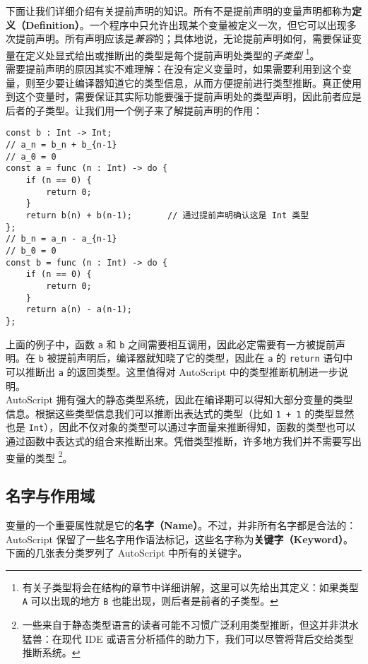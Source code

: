下面让我们详细介绍有关提前声明的知识。所有不是提前声明的变量声明都称为\textbf{定义（Definition）}。一个程序中只允许出现某个变量被定义一次，但它可以出现多次提前声明。所有声明应该是\emph{兼容}的；具体地说，无论提前声明如何，需要保证变量在定义处显式给出或推断出的类型是每个提前声明处类型的\emph{子类型} \footnote{有关子类型将会在结构的章节中详细讲解，这里可以先给出其定义：如果类型 \lstinline!A! 可以出现的地方 \lstinline!B! 也能出现，则后者是前者的子类型。}。 \\

需要提前声明的原因其实不难理解：在没有定义变量时，如果需要利用到这个变量，则至少要让编译器知道它的类型信息，从而方便提前进行类型推断。真正使用到这个变量时，需要保证其实际功能要强于提前声明处的类型声明，因此前者应是后者的子类型。让我们用一个例子来了解提前声明的作用：

\begin{lstlisting}
const b : Int -> Int;
// a_n = b_n + b_{n-1}
// a_0 = 0
const a = func (n : Int) -> do {
    if (n == 0) {
        return 0;
    }
    return b(n) + b(n-1);		// 通过提前声明确认这是 Int 类型
};
// b_n = a_n - a_{n-1}
// b_0 = 0
const b = func (n : Int) -> do {
    if (n == 0) {
        return 0;
    }
    return a(n) - a(n-1);
};
\end{lstlisting}

上面的例子中，函数 \lstinline!a! 和 \lstinline!b! 之间需要相互调用，因此必定需要有一方被提前声明。在 \lstinline!b! 被提前声明后，编译器就知晓了它的类型，因此在 \lstinline!a! 的 \lstinline!return! 语句中可以推断出 \lstinline!a! 的返回类型。这里值得对 AutoScript 中的类型推断机制进一步说明。 \\

AutoScript 拥有强大的静态类型系统，因此在编译期可以得知大部分变量的类型信息。根据这些类型信息我们可以推断出表达式的类型（比如 \lstinline!1 + 1! 的类型显然也是 \lstinline!Int!），因此不仅对象的类型可以通过字面量来推断得知，函数的类型也可以通过函数中表达式的组合来推断出来。凭借类型推断，许多地方我们并不需要写出变量的类型 \footnote{一些来自于静态类型语言的读者可能不习惯广泛利用类型推断，但这并非洪水猛兽：在现代 IDE 或语言分析插件的助力下，我们可以尽管将背后交给类型推断系统。}。


\subsection{名字与作用域}

变量的一个重要属性就是它的\textbf{名字（Name）}。不过，并非所有名字都是合法的：AutoScript 保留了一些名字用作语法标记，这些名字称为\textbf{关键字（Keyword）}。下面的几张表分类罗列了 AutoScript 中所有的关键字。 \\

